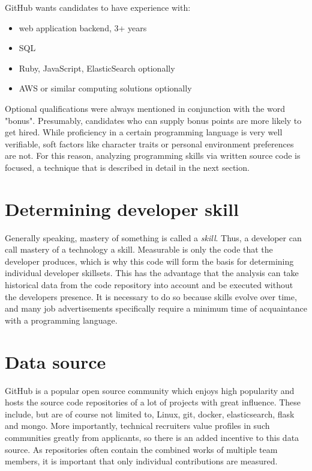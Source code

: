GitHub wants candidates to have experience with:
\begin{itemize}
    \item web application backend, 3+ years
    \item SQL
    \item Ruby, JavaScript, ElasticSearch optionally
    \item AWS or similar computing solutions optionally
\end{itemize}

Optional qualifications were always mentioned in conjunction with the word "bonus". Presumably, candidates who can supply bonus points are more likely to get hired. While proficiency in a certain programming language is very well verifiable, soft factors like character traits or personal environment preferences are not. For this reason, analyzing programming skills via written source code is focused, a technique that is described in detail in the next section.

\section{Determining developer skill}
Generally speaking, mastery of something is called a \textit{skill}. Thus, a developer can call mastery of a technology a skill. Measurable is only the code that the developer produces, which is why this code will form the basis for determining individual developer skillsets. This has the advantage that the analysis can take historical data from the code repository into account and be executed without the developers presence. It is necessary to do so because skills evolve over time, and many job advertisements specifically require a minimum time of acquaintance with a programming language.

\section{Data source}\label{sec:data-source}
GitHub is a popular open source community which enjoys high popularity
and hosts the source code repositories of a lot of projects with great influence. These include, but are of course not limited to, Linux, git, docker, elasticsearch, flask and mongo\cite{rpfd:2014}. More importantly, technical recruiters value profiles in such communities greatly from applicants\cite{md:2013}, so there is an added incentive to this data source. As repositories often contain the combined works of multiple team members, it is important that only individual contributions are measured.

